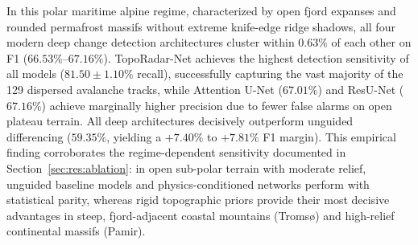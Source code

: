 In this polar maritime alpine regime, characterized by open fjord expanses and rounded permafrost massifs without extreme knife-edge ridge shadows, all four modern deep change detection architectures cluster within $0.63\%$ of each other on F1 ($66.53\%$--$67.16\%$). TopoRadar-Net achieves the highest detection sensitivity of all models ($81.50 \pm 1.10\%$ recall), successfully capturing the vast majority of the 129 dispersed avalanche tracks, while Attention U-Net ($67.01\%$) and ResU-Net ($67.16\%$) achieve marginally higher precision due to fewer false alarms on open plateau terrain. All deep architectures decisively outperform unguided differencing ($59.35\%$, yielding a $+7.40\%$ to $+7.81\%$ F1 margin). This empirical finding corroborates the regime-dependent sensitivity documented in Section~\ref{sec:res:ablation}: in open sub-polar terrain with moderate relief, unguided baseline models and physics-conditioned networks perform with statistical parity, whereas rigid topographic priors provide their most decisive advantages in steep, fjord-adjacent coastal mountains (Troms{\o}) and high-relief continental massifs (Pamir).
